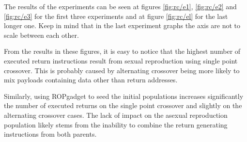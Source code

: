 \documentclass{article}
\begin{document}
The results of the experiments can be seen at figures \ref{fig:rc/e1}, \ref{fig:rc/e2} and  \ref{fig:rc/e3} for the first three experiments and at figure \ref{fig:rc/el} for the last longer one. Keep in mind that in the last experiment graphs the axis are not to scale between each other.

From the results in these figures, it is easy to notice that the highest number of executed return instructions result from sexual reproduction using single point crossover. This is probably caused by alternating crossover being more likely to mix payloads containing data other than return addresses.

Similarly, using ROPgadget to seed the initial populations increases significantly the number of executed returns on the single point crossover and slightly on the alternating crossover cases. The lack of impact on the asexual reproduction population likely stems from the inability to combine the return generating instructions from both parents.
\end{document}
